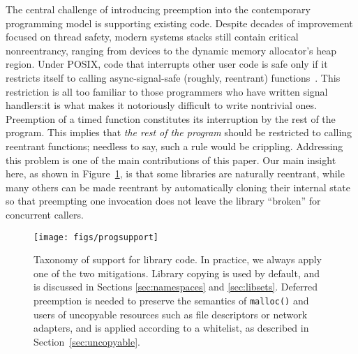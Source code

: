 The central challenge of introducing preemption into the contemporary programming
model is supporting existing code.  Despite decades of improvement focused on thread
safety, modern systems stacks still contain critical nonreentrancy, ranging from
devices to the dynamic memory allocator's heap region.
Under POSIX, code that interrupts other user code is safe only if it restricts
itself to calling async-signal-safe (roughly, reentrant)
functions~\cite{signal-safety-manpage}.  This restriction is all too familiar to
those programmers who have written signal handlers:\@ it is what makes it notoriously
difficult to write nontrivial ones.  Preemption of a timed function constitutes its
interruption by the rest of the program.  This implies that \textit{the rest of the
program} should be restricted to calling reentrant functions; needless to say, such
a rule would be crippling.  Addressing this problem is one of the main contributions
of this paper.  Our main insight here, as shown in Figure~\ref{fig:progsupport}, is
that some libraries are naturally reentrant, while many others can be made reentrant
by automatically cloning their internal state so that preempting one invocation does
not leave the library ``broken'' for concurrent callers.

\begin{figure}
\texttt{[image: figs/progsupport]}
\caption{Taxonomy of support for library code.  \textnormal{In practice, we always
apply one of the two mitigations.  Library copying is used by default, and is
discussed in Sections \ref{sec:namespaces} and \ref{sec:libsets}.  Deferred
preemption is needed to preserve the semantics of \texttt{malloc()} and users of
uncopyable resources such as file descriptors or network adapters, and is applied
according to a whitelist, as described in Section~\ref{sec:uncopyable}.}}
\label{fig:progsupport}
\end{figure}

